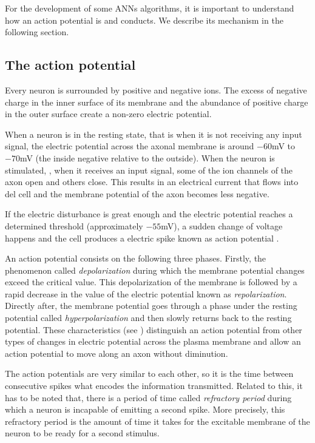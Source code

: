 For the development of some ANNs algorithms, it is important to understand how an action potential is and conducts. We describe its mechanism in the following section.

\subsection{The action potential}
\label{subsec:actionpotential}
Every neuron is surrounded by positive and negative ions. 
The excess of negative charge in the inner surface of its membrane and the abundance of positive charge in the outer surface create a non-zero electric potential.

When a neuron is in the resting state, that is when it is not receiving any input signal, the electric potential across the axonal membrane is around $-60$mV to $-70$mV (the inside negative relative to the outside). When the neuron is stimulated, \ie, when it receives an input signal, some of the ion channels of the axon open and others close. This results in an electrical current that flows into del cell and the membrane potential of the axon becomes less negative.

If the electric disturbance is great enough and the electric potential reaches a determined threshold (approximately $-55$mV), a sudden change of voltage happens and the cell produces a electric spike known as action potential \cite{cellBiology}. 

An action potential consists on the following three phases. Firstly, the phenomenon called \emph{depolarization} during which the membrane potential changes exceed the critical value.
This depolarization of the membrane is followed by a rapid decrease in the value of the electric potential known as \emph{repolarization}.
Directly after, the membrane potential goes through a phase under the resting potential called \emph{hyperpolarization} and then slowly returns back to the resting potential.
These characteristics (see ) distinguish an action potential from other types of changes in electric potential across the plasma membrane and allow an action potential to move along an axon without diminution. 

The action potentials are very similar to each other, so it is the time between consecutive spikes what encodes the information transmitted. Related to this, it has to be noted that, there is a period of time called \emph{refractory period} during which a neuron is incapable of emitting a second spike. More precisely, this refractory period is the amount of time it takes for the excitable membrane of the neuron to be ready for a second stimulus.

